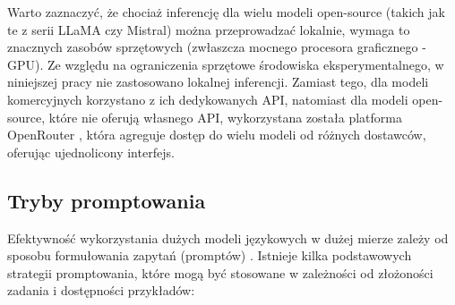 Warto zaznaczyć, że chociaż inferencję dla wielu modeli open-source (takich jak te z serii LLaMA czy Mistral) można przeprowadzać lokalnie, wymaga to znacznych zasobów sprzętowych (zwłaszcza mocnego procesora graficznego - GPU). Ze względu na ograniczenia sprzętowe środowiska eksperymentalnego, w niniejszej pracy nie zastosowano lokalnej inferencji. Zamiast tego, dla modeli komercyjnych korzystano z ich dedykowanych API, natomiast dla modeli open-source, które nie oferują własnego API, wykorzystana została platforma OpenRouter \cite{openrouter}, która agreguje dostęp do wielu modeli od różnych dostawców, oferując ujednolicony interfejs.

\subsection{Tryby promptowania}

Efektywność wykorzystania dużych modeli językowych w dużej mierze zależy od sposobu formułowania zapytań (promptów) \cite{kratzke_dont_2024}. Istnieje kilka podstawowych strategii promptowania, które mogą być stosowane w zależności od złożoności zadania i dostępności przykładów:

